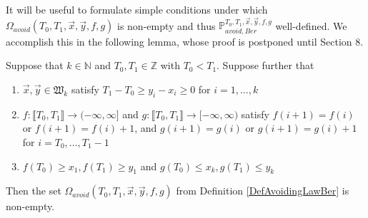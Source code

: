 It will be useful to formulate simple conditions under which $\Omega_{avoid}(T_0, T_1, \vec{x}, \vec{y}, f,g)$ is non-empty and thus $\mathbb{P}_{avoid, Ber}^{T_0,T_1, \vec{x}, \vec{y}, f, g}$ well-defined. We accomplish this in the following lemma, whose proof is postponed until Section 8.

\begin{lemma}\label{LemmaWD} Suppose that $k \in \mathbb{N}$ and $T_0, T_1 \in \mathbb{Z}$ with $T_0 < T_1$. Suppose further that 
\begin{enumerate}
\item $\vec{x}, \vec{y} \in \mathfrak{W}_k$ satisfy $T_1 - T_0 \geq y_i - x_i \geq 0$ for $i = 1, \dots, k$
\item $f : \llbracket T_0, T_1 \rrbracket \rightarrow (-\infty, \infty]$ and $g : \llbracket T_0, T_1 \rrbracket \rightarrow [-\infty, \infty)$ satisfy $f (i+1) = f(i)$ or $f(i+1) = f(i) + 1$, and $g(i+1) = g(i)$ or $g(i+1) = g(i) +1$ for $i = T_0, \dots, T_1 -1$
\item $f(T_0) \geq x_1, f(T_1) \geq y_1$ and $g(T_0) \leq x_k, g(T_1) \leq y_k$ 
\end{enumerate}
Then the set $\Omega_{avoid}(T_0, T_1, \vec{x}, \vec{y}, f,g)$ from Definition \ref{DefAvoidingLawBer} is non-empty.
\end{lemma}

